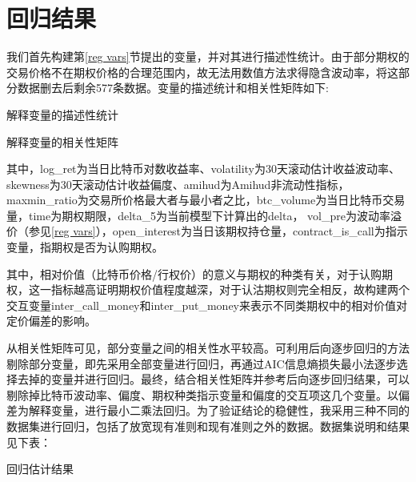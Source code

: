 {\section{回归结果}
我们首先构建第\ref{reg vars}节提出的变量，并对其进行描述性统计。由于部分期权的交易价格不在期权价格的合理范围内，故无法用数值方法求得隐含波动率，将这部分数据删去后剩余577条数据。变量的描述统计和相关性矩阵如下:
\newpage
{}
\begin{landscape} 
\begin{table}[H]
\caption{解释变量的描述性统计}
\resizebox{\linewidth}{!}{

}
\end{table}
\begin{table}[H]
\caption{解释变量的相关性矩阵}
\resizebox{\linewidth}{!}{    }
\end{table}    
\end{landscape}

\newpage
\restoregeometry
其中，log\_ret为当日比特币对数收益率、volatility为30天滚动估计收益波动率、skewness为30天滚动估计收益偏度、amihud为Amihud非流动性指标，maxmin\_ratio为交易所价格最大者与最小者之比，btc\_volume为当日比特币交易量，time为期权期限，delta\_5为当前模型下计算出的delta，
vol\_pre为波动率溢价（参见\ref{reg vars}），open\_interest为当日该期权持仓量，contract\_is\_call为指示变量，指期权是否为认购期权。
\par{其中，相对价值（比特币价格/行权价）的意义与期权的种类有关，对于认购期权，这一指标越高证明期权价值程度越深，对于认沽期权则完全相反，故构建两个交互变量inter\_call\_money和inter\_put\_money来表示不同类期权中的相对价值对定价偏差的影响。}
\par{从相关性矩阵可见，部分变量之间的相关性水平较高。可利用后向逐步回归的方法剔除部分变量，即先采用全部变量进行回归，再通过AIC信息熵损失最小法逐步选择去掉的变量并进行回归。最终，结合相关性矩阵并参考后向逐步回归结果，可以剔除掉比特币波动率、偏度、期权种类指示变量和偏度的交互项这几个变量。以偏差为解释变量，进行最小二乘法回归。为了验证结论的稳健性，我采用三种不同的数据集进行回归，包括了放宽现有准则和现有准则之外的数据。数据集说明和结果见下表：}
\newpage
{}
\begin{center}
\begin{threeparttable}[H]

\caption{回归估计结果}
\label{reg_table}



\end{threeparttable}
\end{center}}
